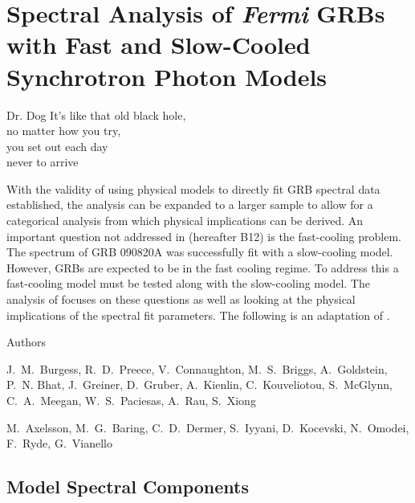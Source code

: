 \chapter{Spectral Analysis of {\it Fermi} GRBs with Fast and Slow-Cooled Synchrotron Photon Models}
\label{ch:pap2}
\begin{chapterquote}{Dr. Dog}
It's like that old black hole,\\
no matter how you try,\\
you set out each day\\
 never to arrive
\end{chapterquote}




With the validity of using physical models to directly fit GRB
spectral data established, the analysis can be expanded to a larger
sample to allow for a categorical analysis from which physical
implications can be derived. An important question not addressed in
\cite{Burgess:2012} (hereafter B12) is the fast-cooling problem. The spectrum of GRB
090820A was successfully fit with a slow-cooling model. However, GRBs
are expected to be in the fast cooling regime. To address this a
fast-cooling model must be tested along with the slow-cooling
model. The analysis of \cite{Burgess:2013} focuses on these questions
as well as looking at the physical implications of the spectral fit
parameters. The following is an adaptation of \cite{Burgess:2013}.

\begin{centering}

Authors

J.~M.~Burgess,
R.~D.~Preece,
V.~Connaughton,
M.~S.~Briggs,
A.~Goldstein,
P.~N. Bhat,
J.~Greiner,
D.~Gruber,
A.~Kienlin,
C.~Kouveliotou,
S.~McGlynn,
C.~A.~Meegan,
W.~S.~Paciesas,
A.~Rau,
S.~Xiong

M.~Axelsson,
M.~G.~Baring,
C.~D.~Dermer,
S.~Iyyani,
D.~Kocevski,
N.~Omodei,
F.~Ryde,
G.~Vianello

\end{centering}

\hspace{2 cm}

\section{Model Spectral Components}
\label{sec:model}




